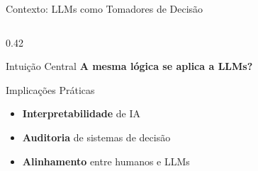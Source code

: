 \documentclass[aspectratio=169, 8pt]{beamer}
\begin{document}
\begin{frame}{Contexto: LLMs como Tomadores de Decisão}
\begin{columns}[T]
\begin{column}{0.42\textwidth}
\begin{exampleblock}{Intuição Central}
        \vspace{0.1em}
        \textbf{A mesma lógica se aplica a LLMs?}
        \vspace{0.05em}
      \end{exampleblock}

      \vspace{0.1em}
      \begin{block}{Implicações Práticas}
        \begin{itemize}
          \item \textbf{Interpretabilidade} de IA
          \item \textbf{Auditoria} de sistemas de decisão
          \item \textbf{Alinhamento} entre humanos e LLMs
        \end{itemize}
      \end{block}
    \end{column}
  \end{columns}
\end{frame}
\end{document}
